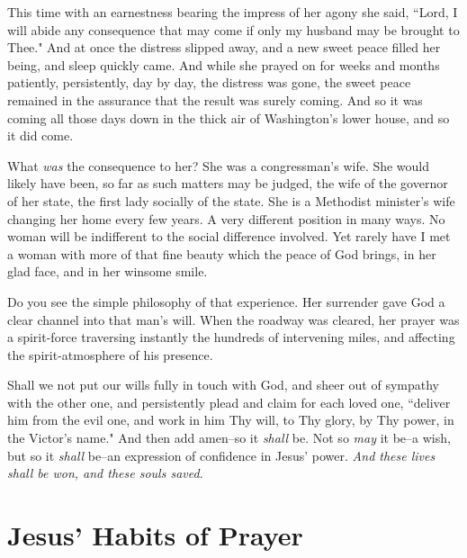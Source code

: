 This time with an earnestness bearing the impress of her agony she said,
``Lord, I will abide any consequence that may come if only my husband may
be brought to Thee." And at once the distress slipped away, and a new
sweet peace filled her being, and sleep quickly came. And while she prayed
on for weeks and months patiently, persistently, day by day, the distress
was gone, the sweet peace remained in the assurance that the result was
surely coming. And so it was coming all those days down in the thick air
of Washington's lower house, and so it did come.

What \textit{was} the consequence to her? She was a congressman's wife. She would
likely have been, so far as such matters may be judged, the wife of the
governor of her state, the first lady socially of the state. She is a
Methodist minister's wife changing her home every few years. A very
different position in many ways. No woman will be indifferent to the
social difference involved. Yet rarely have I met a woman with more of
that fine beauty which the peace of God brings, in her glad face, and in
her winsome smile.

Do you see the simple philosophy of that experience. Her surrender gave
God a clear channel into that man's will. When the roadway was cleared,
her prayer was a spirit-force traversing instantly the hundreds of
intervening miles, and affecting the spirit-atmosphere of his presence.

Shall we not put our wills fully in touch with God, and sheer out of
sympathy with the other one, and persistently plead and claim for each
loved one, ``deliver him from the evil one, and work in him Thy will, to
Thy glory, by Thy power, in the Victor's name." And then add amen--so it
\textit{shall} be. Not so \textit{may} it be--a wish, but so it \textit{shall} be--an
expression of confidence in Jesus' power. \textit{And these lives shall be won,
and these souls saved}.




\part{Jesus' Habits of Prayer}





